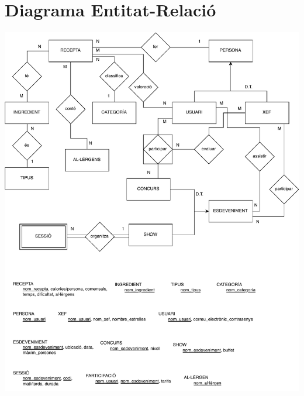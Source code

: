 \documentclass[a4paper,12pt]{article}
\begin{document}


\tableofcontents
\newpage
\section{Diagrama Entitat-Relació}
\begin{center}
	\noindent\includegraphics[width=\textwidth]{diagrama.pdf}
\end{center}
\end{document}
